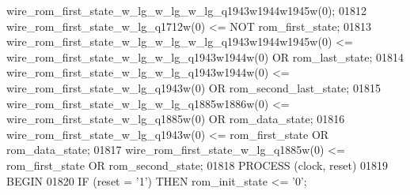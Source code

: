 \begin{DoxyCode}
{{      wire_rom_first_state_w_lg_w_lg_w_lg_q1943w1944w1945w}\textcolor{vhdlchar}{(}\textcolor{vhdllogic}{}\textcolor{vhdllogic}{0}\textcolor{vhdlchar}{)};
01812     \textcolor{vhdlchar}{wire_rom_first_state_w_lg_q1712w}\textcolor{vhdlchar}{(}\textcolor{vhdllogic}{}\textcolor{vhdllogic}{0}\textcolor{vhdlchar}{)} \textcolor{vhdlchar}{<=} \textcolor{keywordflow}{NOT} \textcolor{vhdlchar}{rom_first_state};
01813     \textcolor{vhdlchar}{wire_rom_first_state_w_lg_w_lg_w_lg_q1943w1944w1945w}\textcolor{vhdlchar}{(}\textcolor{vhdllogic}{}\textcolor{vhdllogic}{0}\textcolor{vhdlchar}{)} \textcolor{vhdlchar}{<=} \textcolor{vhdlchar}{
      wire_rom_first_state_w_lg_w_lg_q1943w1944w}\textcolor{vhdlchar}{(}\textcolor{vhdllogic}{}\textcolor{vhdllogic}{0}\textcolor{vhdlchar}{)} \textcolor{keywordflow}{OR} \textcolor{vhdlchar}{rom_last_state};
01814     \textcolor{vhdlchar}{wire_rom_first_state_w_lg_w_lg_q1943w1944w}\textcolor{vhdlchar}{(}\textcolor{vhdllogic}{}\textcolor{vhdllogic}{0}\textcolor{vhdlchar}{)} \textcolor{vhdlchar}{<=} \textcolor{vhdlchar}{
      wire_rom_first_state_w_lg_q1943w}\textcolor{vhdlchar}{(}\textcolor{vhdllogic}{}\textcolor{vhdllogic}{0}\textcolor{vhdlchar}{)} \textcolor{keywordflow}{OR} \textcolor{vhdlchar}{rom_second_last_state};
01815     \textcolor{vhdlchar}{wire_rom_first_state_w_lg_w_lg_q1885w1886w}\textcolor{vhdlchar}{(}\textcolor{vhdllogic}{}\textcolor{vhdllogic}{0}\textcolor{vhdlchar}{)} \textcolor{vhdlchar}{<=} \textcolor{vhdlchar}{
      wire_rom_first_state_w_lg_q1885w}\textcolor{vhdlchar}{(}\textcolor{vhdllogic}{}\textcolor{vhdllogic}{0}\textcolor{vhdlchar}{)} \textcolor{keywordflow}{OR} \textcolor{vhdlchar}{rom_data_state};
01816     \textcolor{vhdlchar}{wire_rom_first_state_w_lg_q1943w}\textcolor{vhdlchar}{(}\textcolor{vhdllogic}{}\textcolor{vhdllogic}{0}\textcolor{vhdlchar}{)} \textcolor{vhdlchar}{<=} \textcolor{vhdlchar}{rom_first_state} \textcolor{keywordflow}{OR} \textcolor{vhdlchar}{rom_data_state};
01817     \textcolor{vhdlchar}{wire_rom_first_state_w_lg_q1885w}\textcolor{vhdlchar}{(}\textcolor{vhdllogic}{}\textcolor{vhdllogic}{0}\textcolor{vhdlchar}{)} \textcolor{vhdlchar}{<=} \textcolor{vhdlchar}{rom_first_state} \textcolor{keywordflow}{OR} \textcolor{vhdlchar}{rom_second_state};
01818     \textcolor{keywordflow}{PROCESS} (clock, reset)
01819 \textcolor{vhdlkeyword}{    BEGIN}
01820         \textcolor{keywordflow}{IF} \textcolor{vhdlchar}{(}\textcolor{vhdlchar}{reset} \textcolor{vhdlchar}{=} \textcolor{vhdlchar}{'}\textcolor{vhdllogic}{}\textcolor{vhdllogic}{1}\textcolor{vhdlchar}{'}\textcolor{vhdlchar}{)} \textcolor{keywordflow}{THEN} \textcolor{vhdlchar}{rom_init_state} \textcolor{vhdlchar}{<=} \textcolor{vhdlchar}{'}\textcolor{vhdllogic}{}\textcolor{vhdllogic}{0}\textcolor{vhdlchar}{'};
}
\end{DoxyCode}
